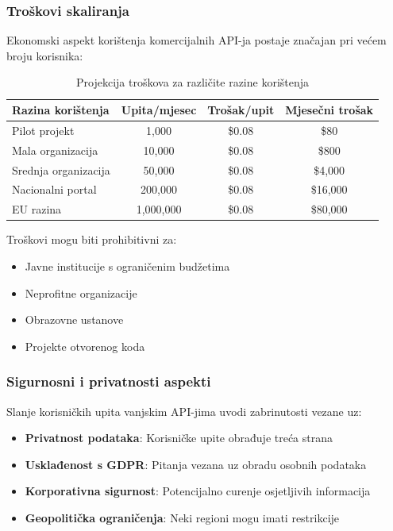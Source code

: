 \subsubsection{Troškovi skaliranja}

Ekonomski aspekt korištenja komercijalnih API-ja postaje značajan pri većem broju korisnika:

\begin{table}[htbp]
\centering
\caption{Projekcija troškova za različite razine korištenja}
\label{tab:cost_projection}
\begin{tabular}{|l|c|c|c|}
\hline
\textbf{Razina korištenja} & \textbf{Upita/mjesec} & \textbf{Trošak/upit} & \textbf{Mjesečni trošak} \\
\hline
Pilot projekt & 1,000 & \$0.08 & \$80 \\
Mala organizacija & 10,000 & \$0.08 & \$800 \\
Srednja organizacija & 50,000 & \$0.08 & \$4,000 \\
Nacionalni portal & 200,000 & \$0.08 & \$16,000 \\
EU razina & 1,000,000 & \$0.08 & \$80,000 \\
\hline
\end{tabular}
\end{table}

Troškovi mogu biti prohibitivni za:
\begin{itemize}
    \item Javne institucije s ograničenim budžetima
    \item Neprofitne organizacije
    \item Obrazovne ustanove
    \item Projekte otvorenog koda
\end{itemize}

\subsubsection{Sigurnosni i privatnosti aspekti}

Slanje korisničkih upita vanjskim API-jima uvodi zabrinutosti vezane uz:

\begin{itemize}
    \item \textbf{Privatnost podataka}: Korisničke upite obrađuje treća strana
    \item \textbf{Usklađenost s GDPR}: Pitanja vezana uz obradu osobnih podataka
    \item \textbf{Korporativna sigurnost}: Potencijalno curenje osjetljivih informacija
    \item \textbf{Geopolitička ograničenja}: Neki regioni mogu imati restrikcije
\end{itemize}

